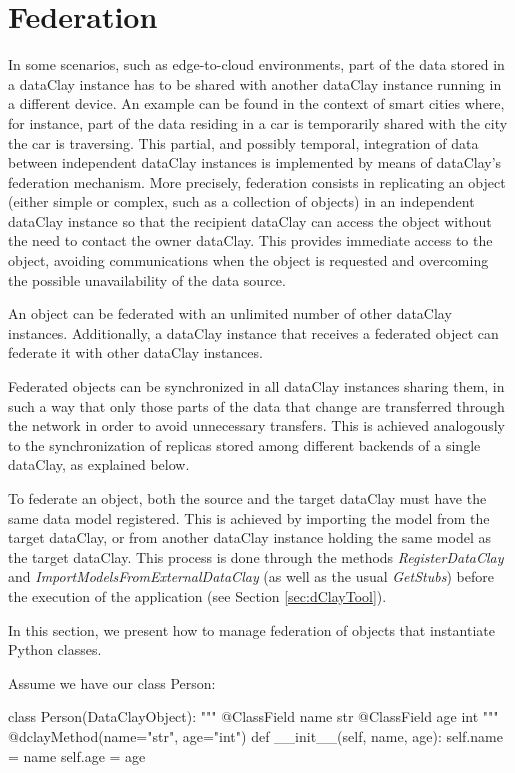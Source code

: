 \section{Federation}
\label{sec:pFederation}

In some scenarios, such as edge-to-cloud environments, part of the data stored in a dataClay instance has to be shared with another dataClay instance running in a different device. An example can be found in the context of smart cities where, for instance, part of the data residing in a car is temporarily shared with the city the car is traversing. This partial, and possibly temporal, integration of data between independent dataClay instances is implemented by means of dataClay's federation mechanism.
More precisely, federation consists in replicating an object (either simple or complex, such as a collection of objects) in an independent dataClay instance so that the recipient dataClay can access the object without the need to contact the owner dataClay. This provides immediate access to the object, avoiding communications when the object is requested and overcoming the possible unavailability of the data source. 

An object can be federated with an unlimited number of other dataClay instances. Additionally, a dataClay instance that receives a federated object can federate it with other dataClay instances.

Federated objects can be synchronized in all dataClay instances sharing them, in such a way that only those parts of the data that change are transferred through the network in order to avoid unnecessary transfers. This is achieved analogously to the synchronization of replicas stored among different backends of a single dataClay, as explained below. 

To federate an object, both the source and the target dataClay must have the same data model registered. This is achieved by importing the model from the target dataClay, or from another dataClay instance holding the same model as the target dataClay. This process is done through the methods \textit{RegisterDataClay} and \textit{ImportModelsFromExternalDataClay} (as well as the usual \textit{GetStubs}) before the execution of the application (see Section \ref{sec:dClayTool}).

In this section, we present how to manage federation of objects that instantiate Python classes. 

Assume we have our class Person:

\begin{tBox}
\begin{python}
class Person(DataClayObject):
     """
     @ClassField name str
     @ClassField age int
     """
    @dclayMethod(name="str", age="int")
    def __init__(self, name, age):
        self.name = name
        self.age = age
\end{python}
\end{tBox}

